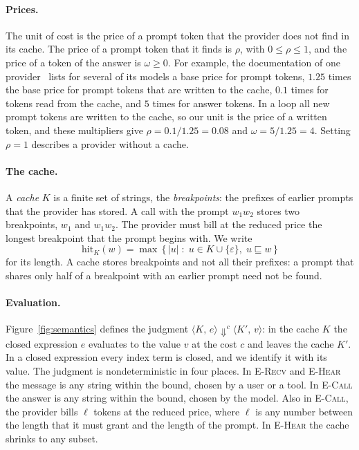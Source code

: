 \documentclass[acmsmall,nonacm,screen]{acmart}
\newcommand{\ev}[5]{\langle #1,\, #2\rangle \Downarrow^{#3} \langle #4,\, #5\rangle}
\newcommand{\hit}{\mathrm{hit}}
\newcommand{\pre}{\sqsubseteq}
\newcommand{\eps}{\varepsilon}
\begin{document}
\paragraph{Prices.} The unit of cost is the price of a prompt token that the provider does not
find in its cache. The price of a prompt token that it finds is $\rho$, with
$0 \le \rho \le 1$, and the price of a token of the answer is $\omega \ge 0$. For example, the
documentation of one provider~\cite{anthropic2026} lists for several of its models a base price
for prompt tokens, $1.25$ times the base price for prompt tokens that are written to the
cache, $0.1$ times for tokens read from the cache, and $5$ times for answer tokens. In a loop
all new prompt tokens are written to the cache, so our unit is the price of a written token,
and these multipliers give $\rho = 0.1/1.25 = 0.08$ and $\omega = 5/1.25 = 4$. Setting
$\rho = 1$ describes a provider without a cache.

\paragraph{The cache.} A \emph{cache} $K$ is a finite set of strings, the \emph{breakpoints}:
the prefixes of earlier prompts that the provider has stored. A call with the prompt $w_1w_2$
stores two breakpoints, $w_1$ and $w_1w_2$. The provider must bill at the reduced price the
longest breakpoint that the prompt begins with. We write
\[
\hit_K(w) = \max\,\{\, |u| \;:\; u \in K \cup \{\eps\},\; u \pre w \,\}
\]
for its length. A cache stores breakpoints and not all their prefixes: a prompt that shares
only half of a breakpoint with an earlier prompt need not be found.

\paragraph{Evaluation.} Figure~\ref{fig:semantics} defines the judgment
$\ev{K}{e}{c}{K'}{v}$: in the cache $K$ the closed expression $e$ evaluates to the value $v$
at the cost $c$ and leaves the cache $K'$. In a closed expression every index term is closed,
and we identify it with its value. The judgment is nondeterministic in four places. In
\textsc{E-Recv} and \textsc{E-Hear} the message is any string within the bound, chosen by a
user or a tool. In \textsc{E-Call} the answer is any string within the bound, chosen by the
model. Also in \textsc{E-Call}, the provider bills $\ell$ tokens at the reduced price, where
$\ell$ is any number between the length that it must grant and the length of the prompt. In
\textsc{E-Hear} the cache shrinks to any subset.
\end{document}
